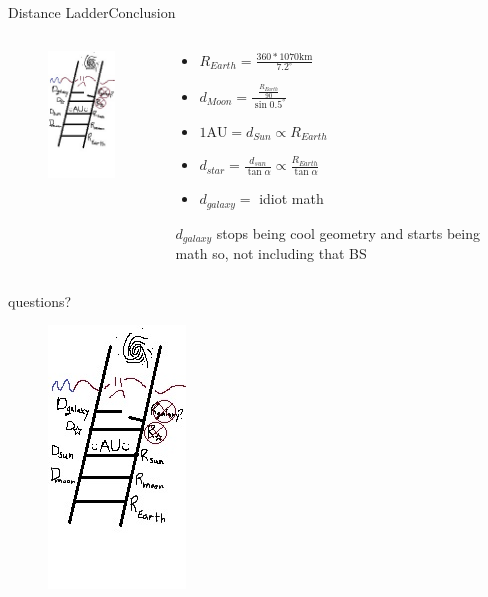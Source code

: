 \documentclass[12pt]{beamer}
\begin{document}
        \begin{frame}{Distance Ladder}{Conclusion}
            \begin{columns}
                \begin{column}{0.5\linewidth}
                    \begin{figure}
                        \includegraphics{distanceladder4.jpg}
                    \end{figure}
                \end{column}
                \begin{column}{0.5\linewidth}
                    \begin{itemize}
                        \item $R_{Earth}=\frac{360*1070\mathrm{km}}{7.2^\circ}$
                        \item $d_{Moon}=\frac{\frac{R_{Earth}}{90}}{\sin{0.5^\circ}}$
                        \item $\mathrm{1AU}=d_{Sun}\propto{R_{Earth}}$
                        \item $d_{star}=\frac{d_{sun}}{\tan\alpha}\propto\frac{R_{Earth}}{\tan\alpha}$
                        \item $d_{galaxy}=$ idiot math
                    \end{itemize}
                    $d_{galaxy}$ stops being cool geometry and starts being math so, not including that BS
                \end{column}
            \end{columns}
        \end{frame}
        \begin{frame}{questions?}
            \begin{figure}
                \includegraphics{distanceladder4.jpg}
            \end{figure}
        \end{frame}
\end{document}
